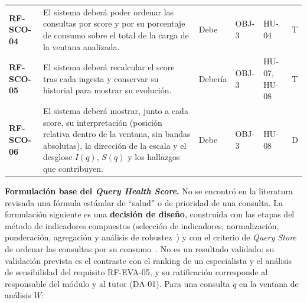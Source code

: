 \documentclass[11pt,a4paper]{report}
\begin{document}
\begin{footnotesize}
\begin{xltabular}{\linewidth}{@{}p{1.7cm}Xp{1.1cm}p{1.3cm}p{1.6cm}p{0.9cm}@{}}
\textbf{RF-SCO-04} & El sistema deberá poder ordenar las consultas por score y por su porcentaje de consumo sobre el total de la carga de la ventana analizada. & Debe & OBJ-3 & HU-04 & T \\
\textbf{RF-SCO-05} & El sistema deberá recalcular el score tras cada ingesta y conservar su historial para mostrar su evolución. & Debería & OBJ-3 & HU-07, HU-08 & T \\
\textbf{RF-SCO-06} & El sistema deberá mostrar, junto a cada score, su interpretación (posición relativa dentro de la ventana, sin bandas absolutas), la dirección de la escala y el desglose $I(q)$, $S(q)$ y los hallazgos que contribuyen. & Debe & OBJ-3 & HU-08 & D \\
\end{xltabular}
\end{footnotesize}

\medskip
\textbf{Formulaci\'on base del \textit{Query Health Score}.} No se encontr\'o en la literatura revisada una f\'ormula est\'andar de ``salud'' o de prioridad de una consulta. La formulaci\'on siguiente es una \textbf{decisi\'on de dise\~no}, construida con las etapas del m\'etodo de indicadores compuestos (selecci\'on de indicadores, normalizaci\'on, ponderaci\'on, agregaci\'on y an\'alisis de robustez~\cite{R32}) y con el criterio de \textit{Query Store} de ordenar las consultas por su consumo~\cite{R34}. No es un resultado validado: su validaci\'on prevista es el contraste con el ranking de un especialista y el an\'alisis de sensibilidad del requisito RF-EVA-05, y su ratificaci\'on corresponde al responsable del m\'odulo y al tutor (DA-01). Para una consulta $q$ en la ventana de an\'alisis $W$:
\end{document}

